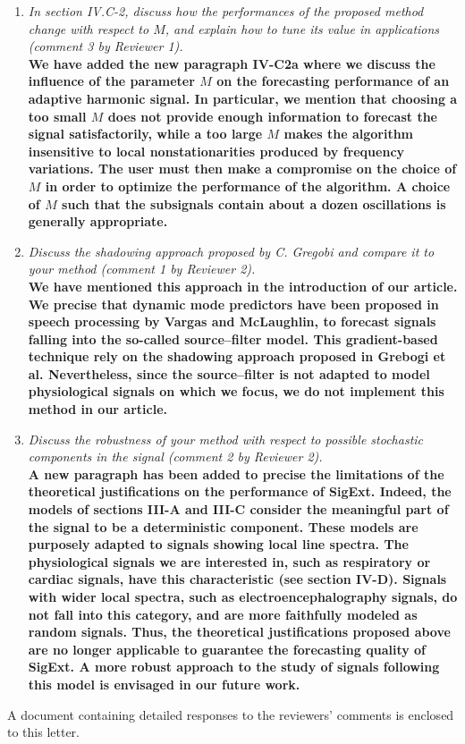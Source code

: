 \documentclass[11pt,letterpaper,roman]{moderncv}
\begin{document}
\begin{enumerate}
\item
\textit{In section IV.C-2, discuss how the performances of the proposed method change with respect to $M$, and explain how to tune its value in applications (comment 3 by Reviewer 1).}\\
\textbf{We have added the new paragraph IV-C2a where we discuss the influence of the parameter $M$ on the forecasting performance of an adaptive harmonic signal. In particular, we mention that choosing a too small $M$ does not provide enough information to forecast the signal satisfactorily, while a too large $M$ makes the algorithm insensitive to local nonstationarities produced by frequency variations. The user must then make a compromise on the choice of $M$ in order to optimize the performance of the algorithm. A choice of $M$ such that the subsignals contain about a dozen oscillations is generally appropriate.}
\item
\textit{Discuss the shadowing approach proposed by C. Gregobi and compare it to your method (comment 1 by Reviewer 2).}\\
\textbf{We have mentioned this approach in the introduction of our article. We precise that dynamic mode predictors have been proposed in speech processing by Vargas and McLaughlin, to forecast signals  falling into the so-called source--filter model. This gradient-based technique rely on the shadowing approach proposed in Grebogi et al. Nevertheless,  since the source--filter is not adapted to model physiological signals on which we focus, we do not implement this method in our article.}
\item
\textit{Discuss the robustness of your method with respect to possible stochastic components in the signal (comment 2 by Reviewer 2).}\\
\textbf{A new paragraph has been added to precise the limitations of the theoretical justifications on the performance of \textsf{SigExt}. Indeed, the models of sections III-A and III-C consider the meaningful part of the signal to be a deterministic component. These models are purposely adapted to signals showing local line spectra. The physiological signals we are interested in, such as respiratory or cardiac signals, have this characteristic (see section IV-D). Signals with wider local spectra, such as electroencephalography signals, do not fall into this category, and are more faithfully modeled as random signals. Thus, the theoretical justifications proposed above are no longer applicable to guarantee the forecasting quality of \textsf{SigExt}. A more robust approach to the study of signals following this model is envisaged in our future work.}
\end{enumerate}

A document containing detailed responses to the reviewers' comments is enclosed to this letter.

\makeletterclosing
\end{document}
